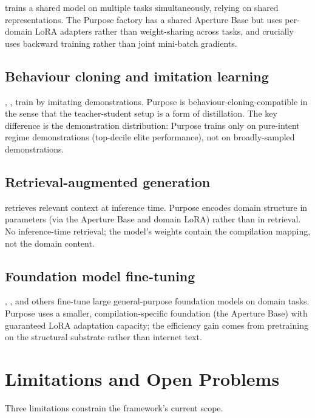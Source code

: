 \documentclass[twocolumn,11pt,a4paper]{article}
\begin{document}
\citet{caruana1997multitask} trains a shared model on multiple tasks simultaneously, relying on shared representations. The Purpose factory has a shared Aperture Base but uses per-domain LoRA adapters rather than weight-sharing across tasks, and crucially uses backward training rather than joint mini-batch gradients.

\subsection{Behaviour cloning and imitation learning}

\citet{ross2011reduction}, \citet{codevilla2018end}, \citet{bansal2019chauffeurnet} train by imitating demonstrations. Purpose is behaviour-cloning-compatible in the sense that the teacher-student setup is a form of distillation. The key difference is the demonstration distribution: Purpose trains only on pure-intent regime demonstrations (top-decile elite performance), not on broadly-sampled demonstrations.

\subsection{Retrieval-augmented generation}

\citet{lewis2020retrieval} retrieves relevant context at inference time. Purpose encodes domain structure in parameters (via the Aperture Base and domain LoRA) rather than in retrieval. No inference-time retrieval; the model's weights contain the compilation mapping, not the domain content.

\subsection{Foundation model fine-tuning}

\citet{brown2020language}, \citet{touvron2023llama}, and others fine-tune large general-purpose foundation models on domain tasks. Purpose uses a smaller, compilation-specific foundation (the Aperture Base) with guaranteed LoRA adaptation capacity; the efficiency gain comes from pretraining on the structural substrate rather than internet text.


\section{Limitations and Open Problems}
\label{sec:limitations}

Three limitations constrain the framework's current scope.
\end{document}
